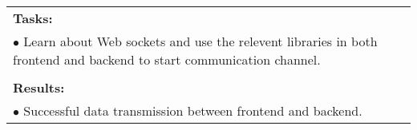 \begin{table}[!h]
\begin{center}
\begin{tabular}{|p{}||p{}|p{}||p{}|}
            \multicolumn{4}{|p{.95\columnwidth}|}{\textbf{Tasks:}}\\
            \multicolumn{4}{|p{.95\columnwidth}|}{$\bullet$ Learn about Web sockets and use the relevent libraries in both frontend and backend to start communication channel.}\\
            \multicolumn{4}{|p{.95\columnwidth}|}{}\\
            \multicolumn{4}{|p{.95\columnwidth}|}{\textbf{Results:}}\\
            \multicolumn{4}{|p{.95\columnwidth}|}{$\bullet$ Successful data transmission between frontend and backend.}\\
            \hline
        \end{tabular}
    \end{center}
\end{table}

\clearpage

